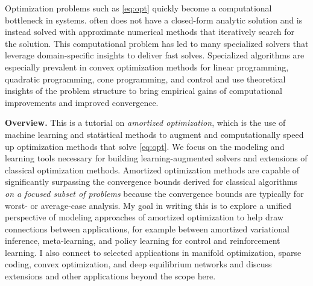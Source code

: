 \documentclass[twoside,11pt]{article}
\begin{document}
Optimization problems such as \cref{eq:opt} quickly become a
computational bottleneck in systems.
 often does not have a closed-form
analytic solution and is instead solved with
approximate numerical methods that iteratively
search for the solution.
This computational problem has led to many specialized
solvers that leverage domain-specific insights to
deliver fast solves. Specialized algorithms are
especially prevalent in convex optimization methods for
linear programming, quadratic programming, cone programming,
and control and use theoretical insights of the problem
structure to bring empirical gains of computational
improvements and improved convergence.

\textbf{Overview.} This is a tutorial on \emph{amortized optimization},
which is the use of machine learning and statistical
methods to augment and computationally speed up
optimization methods that solve \cref{eq:opt}.
We focus on the modeling and learning tools necessary for
building learning-augmented solvers and extensions of
classical optimization methods.
Amortized optimization methods are capable of
significantly surpassing the convergence bounds derived
for classical algorithms
\emph{on a focused subset of problems}
because the convergence bounds are typically for worst-
or average-case analysis.
My goal in writing this is to explore a unified perspective
of modeling approaches of amortized optimization to help draw
connections between applications, for example between
amortized variational inference, meta-learning,
and policy learning for control and reinforcement learning.
I also connect to selected applications
in manifold optimization, sparse coding, convex optimization,
and deep equilibrium networks and discuss extensions
and other applications beyond the scope here.
\end{document}
